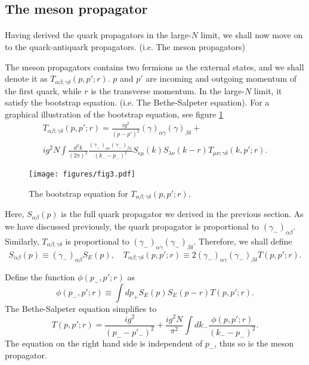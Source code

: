 \documentclass{article}
\begin{document}
\subsection{The meson propagator}
\paragraph{}
Having derived the quark propagators in the large-$N$ limit, we shall now move on to the quark-antiquark propagators. (i.e. The meson propagators)

The meson propagators contains two fermions as the external states, and we shall denote it as $T_{\alpha\beta;\gamma\delta}(p, p{}';r)$. $p$ and $p{}'$ are incoming and outgoing momentum of the first quark, while $r$ is the transverse momentum.
In the large-$N$ limit, it satisfy the bootstrap equation. (i.e. The Bethe-Salpeter equation). For a graphical illustration of the bootstrap equation, see figure \ref{fig3}
\begin{gather*}
    T_{\alpha\beta;\gamma\delta}(p, p{}';r) = \frac{ig^{2}}{(p-p{}')^{2}}(\gamma)_{\alpha\gamma}(\gamma)_{\beta\delta} +\\
    ig^{2}N\int\frac{d^{2}k}{(2\pi)^{2}}\frac{(\gamma_{-})_{\alpha\epsilon}(\gamma_{-})_{\beta\lambda}}{(k_{-}-p_{-})^{2}}S_{\epsilon\mu}(k)S_{\lambda\nu}(k-r)T_{\mu\nu;\gamma\delta}(k, p{}';r).
\end{gather*}

\begin{figure}[h]
		\centering
		\texttt{[image: figures/fig3.pdf]}
    \caption{The bootstrap equation for $T_{\alpha\beta;\gamma\delta}(p, p{}';r)$. \label{fig3}}
\end{figure}

Here, $S_{\alpha\beta}(p)$ is the full quark propagator we derived in the previous section. As we have discussed previously, the quark propagator is proportional to $(\gamma_{-})_{\alpha\beta}$. Similarly, $T_{\alpha\beta;\gamma\delta}$ is proportional to $(\gamma_{-})_{\alpha\gamma}(\gamma_{-})_{\beta\delta}$. Therefore, we shall define
\[ 
    S_{\alpha\beta}(p) \equiv (\gamma_{-})_{\alpha\beta}S_{E}(p),\quad  T_{\alpha\beta;\gamma\delta}(p, p{}';r) \equiv 2(\gamma_{-})_{\alpha\gamma}(\gamma_{-})_{\beta\delta}T(p, p{}';r).
\] 

Define the function $\phi(p_{-}, p{}'; r)$ as 
\[ 
    \phi(p_{-}, p{}'; r) \equiv \int dp_{+} S_{E}(p)S_{E}(p-r)T(p, p{}'; r).
\] 
The Bethe-Salpeter equation simplifies to 
\[ 
    T(p, p{}'; r) = \frac{ig^2}{(p_{-}-p{}'_{-})^{2}} + \frac{ig^{2}N}{\pi^{2}}\int dk_{-} \frac{\phi(p, p{}';r)}{(k_{-}-p_{-})^{2}}.
\]
The equation on the right hand side is independent of $p_{-}$, thus so is the meson propagator. 
\end{document}

